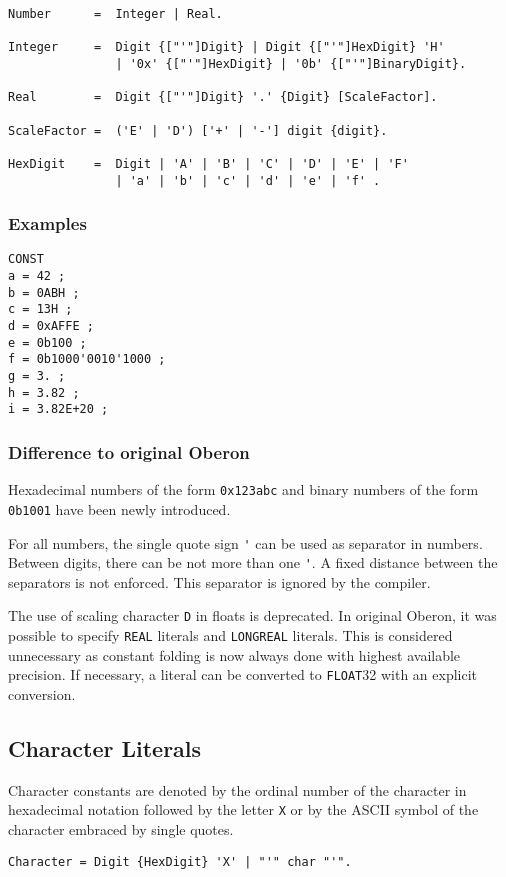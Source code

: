 \documentclass[a4wide,11pt]{article}
\newcommand{\FLOAT}{\lstinline"FLOAT"}
\begin{document}
\begin{lstlisting}[style=ebnf]
Number      =  Integer | Real.

Integer     =  Digit {["'"]Digit} | Digit {["'"]HexDigit} 'H'
               | '0x' {["'"]HexDigit} | '0b' {["'"]BinaryDigit}.

Real        =  Digit {["'"]Digit} '.' {Digit} [ScaleFactor].

ScaleFactor =  ('E' | 'D') ['+' | '-'] digit {digit}.

HexDigit    =  Digit | 'A' | 'B' | 'C' | 'D' | 'E' | 'F'
               | 'a' | 'b' | 'c' | 'd' | 'e' | 'f' .
\end{lstlisting}

\begin{annotation}
\subsubsection{Examples}
\begin{lstlisting}[style=example,caption=Examples of Number Literals in constant declarations]
CONST
a = 42 ;
b = 0ABH ;
c = 13H ;
d = 0xAFFE ;
e = 0b100 ;
f = 0b1000'0010'1000 ;
g = 3. ;
h = 3.82 ;
i = 3.82E+20 ;
\end{lstlisting}

\subsubsection{Difference to original Oberon}
Hexadecimal numbers of the form \lstinline"0x123abc" and binary numbers of the form \lstinline"0b1001" have been newly introduced.

For all numbers, the single quote sign \lstinline"'" can be used as separator in numbers.
Between digits, there can be not more than one \lstinline"'".
A fixed distance between the separators is not enforced.
This separator is ignored by the compiler.

The use of scaling character \lstinline"D" in floats is deprecated.
In original Oberon, it was possible to specify \verb"REAL" literals and \verb"LONGREAL" literals.
This is considered unnecessary as constant folding is now always done with highest available precision.
If necessary, a literal can be converted to \FLOAT32 with an explicit conversion.

\end{annotation}

\subsection{Character Literals}
Character constants are denoted by the ordinal number of the character in hexadecimal notation followed by the letter \verb~X~ or by the ASCII symbol of the character embraced by single quotes.
\begin{lstlisting}[style=ebnf]
Character = Digit {HexDigit} 'X' | "'" char "'".
\end{lstlisting}
\end{document}
